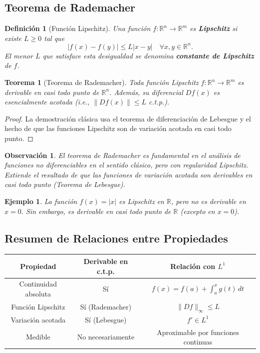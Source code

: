 \documentclass[12pt]{book}
\newtheorem{theorem}{Teorema}
\newtheorem{definition}{Definición}
\newtheorem{remark}{Observación}
\newtheorem{ex}{Ejemplo}
\theoremstyle{definition}
\theoremstyle{plain}
\theoremstyle{remark}
\begin{document}
\subsection{Teorema de Rademacher} %

\begin{definition}[Función Lipschitz]
Una función \(f: \mathbb{R}^n \to \mathbb{R}^m\) es \textbf{Lipschitz} si existe \(L \geq 0\) tal que
\[
|f(x) - f(y)| \leq L |x - y| \quad \forall x, y \in \mathbb{R}^n.
\]
El menor \(L\) que satisface esta desigualdad se denomina \textbf{constante de Lipschitz} de \(f\).
\end{definition}

\begin{theorem}[Teorema de Rademacher]
Toda función Lipschitz \(f: \mathbb{R}^n \to \mathbb{R}^m\) es derivable en casi todo punto de \(\mathbb{R}^n\). Además, su diferencial \(Df(x)\) es esencialmente acotada (i.e., \(\|Df(x)\| \leq L\) c.t.p.).
\end{theorem}

\begin{proof}
La demostración clásica usa el teorema de diferenciación de Lebesgue y el hecho de que las funciones Lipschitz son de variación acotada en casi todo punto. %
\end{proof}

\begin{remark}
El teorema de Rademacher es fundamental en el análisis de funciones no diferenciables en el sentido clásico, pero con regularidad Lipschitz. Extiende el resultado de que las funciones de variación acotada son derivables en casi todo punto (Teorema de Lebesgue).
\end{remark}

\begin{ex}
La función \(f(x) = |x|\) es Lipschitz en \(\mathbb{R}\), pero no es derivable en \(x=0\). Sin embargo, es derivable en casi todo punto de \(\mathbb{R}\) (excepto en \(x=0\)).
\end{ex}

\subsection{Resumen de Relaciones entre Propiedades}
{\footnotesize
\begin{center}
\begin{tabular}{|c|c|c|}
\hline
\textbf{Propiedad} & \textbf{Derivable en c.t.p.} & \textbf{Relación con \(L^1\)} \\
\hline
Continuidad absoluta & Sí & \(f(x) = f(a) + \int_a^x g(t) \, dt\) \\
Función Lipschitz & Sí (Rademacher) & \(\|Df\|_\infty \leq L\) \\
Variación acotada & Sí (Lebesgue) & \(f' \in L^1\) \\
Medible & No necesariamente & Aproximable por funciones continuas \\
\hline
\end{tabular}
\end{center}
}
\end{document}
